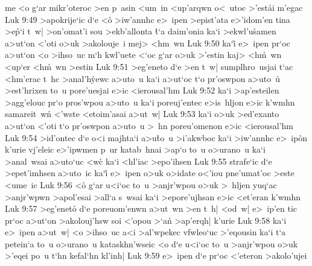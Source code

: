 me
<o
g`ar
mikr'oteroc
>en
p~asin
<um~in
<up'arqwn
o<~utoc
>'est\r{a}i
m'egac\bibvsend
\vs Luk 9:49
>apokrije`ic
d`e
<o\r{}
>iw'annhc
e>~ipen
>epist'ata
e>'idom'en
tina
>e\r{p}`i
t~w|
>on'omat'i
sou
>ekb'allonta
\r{t}`a
daim'onia
ka`i
>ekwl'u\r{s}amen
a>ut`on
<'oti
o>uk
>akolouje~i
mej>
<hm~wn\bibvsend
\vs Luk 9:50
ka`i\r{}
e>~ipen
pr`oc
a>ut`on
<o
>ihso~uc
m`h
kwl'uete
<`oc
g`ar
o>uk
>'estin
kaj>
<h\r{m}~wn
<up`er
<h\r{m}~wn
>estin\bibvsend
\vs Luk 9:51
>eg'eneto
d`e
>en
t~w|
sumplhro~usjai
t`ac
<hm'erac
t~hc
>anal'h\r{y}ewc
a>uto~u
ka`i
a>ut`oc
t`o
pr'oswpon
a>uto~u\r{}
>est'hrixen
to~u
pore'uesjai
e>ic
<ierousal'hm\bibvsend
\vs Luk 9:52
ka`i
>ap'esteilen
>agg'elouc
pr`o
pros'wpou
a>uto~u
ka`i
poreuj'entec
e>is~hljon
e>ic
k'wmhn
samareit~wn\r{}
<'wste
<etoim'asai
a>ut~w|\bibvsend
\vs Luk 9:53
ka`i
o>uk
>ed'exanto
a>ut`on
<'oti
t`o
pr'oswpon
a>uto~u
>~hn
poreu'omenon
e>ic
<ierousal'hm\bibvsend
\vs Luk 9:54
>id'ontec
d`e
o<i
majhta`i
a>u\r{t}o~u
>i'akwboc
ka`i
>iw'annhc
e>~ip\r{o}n
k'urie
vj'eleic
e>'ipwmen
p~ur
katab~hnai
>ap`o
to~u
o>urano~u
ka`i
>anal~wsai
a>uto`uc
<wc\r{}
ka`i
<hl'iac
>epo'ihsen\bibvsend
\vs Luk 9:55
strafe`ic
d`e
>epet'imhsen
a>uto~ic
ka`i\r{}
e>~ipen
o>uk
o>idate
o<'iou
pne'umat'oc
>este
<ume~ic\bibvsend
\vs Luk 9:56
<o\r{}
g`ar
u<i`oc
to~u
>anjr'wpou
o>uk
>~hljen
yuq`ac
>anjr'wpwn
>apol'esai
>all`a
s~wsai
ka`i
>epore'ujhsan
e>ic
<et'eran
k'wmhn\bibvsend
\vs Luk 9:57
>eg'eneto\r{}
d`e
poreuom'enwn
a>ut~wn
>en
t~h|
<od~w|
e>~ip'en
tic
pr`oc
a>ut`on
>akolouj'hsw
soi
<'opou
>`an\r{}
>ap'erqh|
k'urie\bibvsend
\vs Luk 9:58
ka`i
e>~ipen
a>ut~w|
<o
>ihso~uc
a<i
>al'wpekec
vfwleo`uc
>'eqousin
ka`i
t`a
petein`a
to~u
o>urano~u
kataskhn'wseic
<o
d`e
u<i`oc
to~u
>anjr'wpou
o>uk
>'eqei
po~u
t`hn
kefal`hn
kl'inh|\bibvsend
\vs Luk 9:59
e>~ipen
d`e
pr`oc
<'eteron
>akolo'ujei
